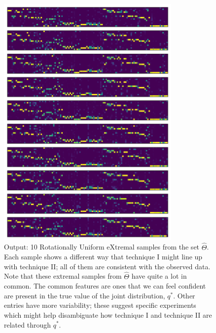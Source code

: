 \begin{figure}
\includegraphics[width=0.8\textwidth]{pics/allenRUX}
\caption{Output: 10 Rotationally Uniform eXtremal samples from the set $\hat \Theta$.  Each sample shows a different way that technique I might line up with technique II; all of them are consistent with the observed data.  Note that these extremal samples from $\hat \Theta$ have quite a lot in common.  The common features are ones that we can feel confident are present in the true value of the joint distribution, $q^*$.  Other entries have more variability; these suggest specific experiments which might help disambiguate how technique I and technique II are related through $q^*$.  \label{fig:allenRUX}}
\end{figure}

